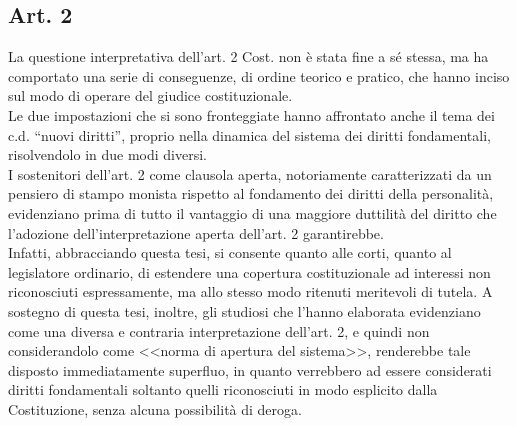 \subsection{Art. 2}
La questione interpretativa dell’art. 2 Cost. non è stata fine a sé stessa, ma ha comportato una serie di conseguenze, di ordine teorico e pratico, che hanno inciso sul modo di operare del giudice costituzionale.  
\\Le due impostazioni che si sono fronteggiate hanno affrontato anche il tema dei c.d. “nuovi diritti”, proprio nella dinamica del sistema dei diritti fondamentali, risolvendolo in due modi diversi.
\\I sostenitori dell'art. 2 come clausola aperta, notoriamente caratterizzati da un pensiero di stampo monista rispetto al fondamento dei diritti della personalità, evidenziano prima di tutto il vantaggio di una maggiore duttilità del diritto che l'adozione dell'interpretazione aperta dell'art. 2 garantirebbe.
\\Infatti, abbracciando questa tesi, si consente quanto alle corti, quanto al legislatore ordinario, di estendere una copertura costituzionale ad interessi non riconosciuti espressamente, ma allo stesso modo ritenuti meritevoli di tutela. A sostegno di questa tesi, inoltre, gli studiosi che l'hanno elaborata evidenziano come una diversa e contraria interpretazione dell'art. 2, e quindi non considerandolo come <<norma di apertura del sistema>>, renderebbe tale disposto immediatamente superfluo, in quanto verrebbero ad essere considerati diritti fondamentali soltanto quelli riconosciuti in modo esplicito dalla Costituzione, senza alcuna possibilità di deroga.
